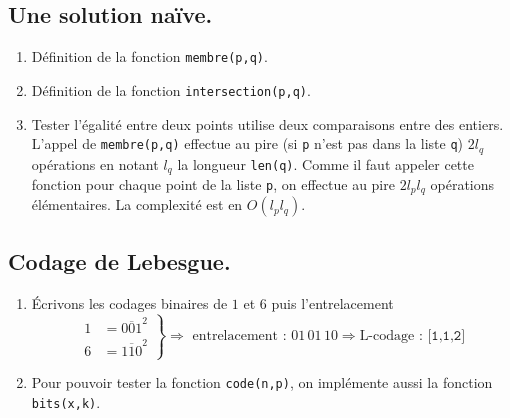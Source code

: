 \subsection{Une solution naïve.}
\begin{enumerate}
 \item Définition de la fonction \texttt{membre(p,q)}.


 \item Définition de la fonction \texttt{intersection(p,q)}.


 \item Tester l'égalité entre deux points utilise deux comparaisons entre des entiers. L'appel de \texttt{membre(p,q)} effectue au pire (si \texttt{p} n'est pas dans la liste \texttt{q}) $2l_q$ opérations en notant $l_q$ la longueur \texttt{len(q)}. Comme il faut appeler cette fonction pour chaque point de la liste \texttt{p}, on effectue au pire $2l_p l_q$ opérations élémentaires. La complexité est en $O(l_p l_q)$.
\end{enumerate}

\subsection{Codage de Lebesgue.}
\begin{enumerate}[resume]
 \item \'Ecrivons les codages binaires de $1$ et $6$ puis l'entrelacement 
\[
\left. 
\begin{aligned}
1 &= \overline{001}^2 \\ 6 &= \overline{110}^2 
\end{aligned}
\right\rbrace \Rightarrow
\text{ entrelacement : } 01\,01\,10
\Rightarrow \text{L-codage : } \texttt{[1,1,2]}
\]

 \item Pour pouvoir tester la fonction \texttt{code(n,p)}, on implémente aussi la fonction \texttt{bits(x,k)}.


\end{enumerate}


